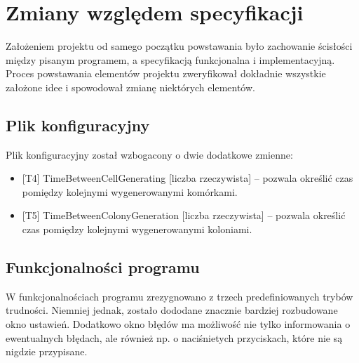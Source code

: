 \documentclass[11pt,a4paper]{report}
\begin{document}
\section{Zmiany względem specyfikacji}\label{sec:teskt}
Założeniem projektu od samego początku powstawania było zachowanie ścisłości między pisanym programem, a specyfikacją funkcjonalna i implementacyjną. Proces powstawania elementów projektu zweryfikował dokładnie wszystkie założone idee i spowodował zmianę niektórych elementów.
\subsection {Plik konfiguracyjny}
Plik konfiguracyjny został wzbogacony o dwie dodatkowe zmienne:
\begin{itemize}
\item{}[T4] TimeBetweenCellGenerating [liczba rzeczywista] -- pozwala określić czas pomiędzy kolejnymi wygenerowanymi komórkami.
\item{}[T5] TimeBetweenColonyGeneration [liczba rzeczywista] -- pozwala określić czas pomiędzy kolejnymi wygenerowanymi koloniami.
\end{itemize}
\subsection {Funkcjonalności programu}
W funkcjonalnościach programu zrezygnowano z trzech predefiniowanych trybów trudności. Niemniej jednak, zostało dododane znacznie bardziej rozbudowane okno ustawień. Dodatkowo okno błędów ma możliwość nie tylko informowania o ewentualnych błędach, ale również np. o naciśnietych przyciskach, które nie są nigdzie przypisane.
 
\end{document}
